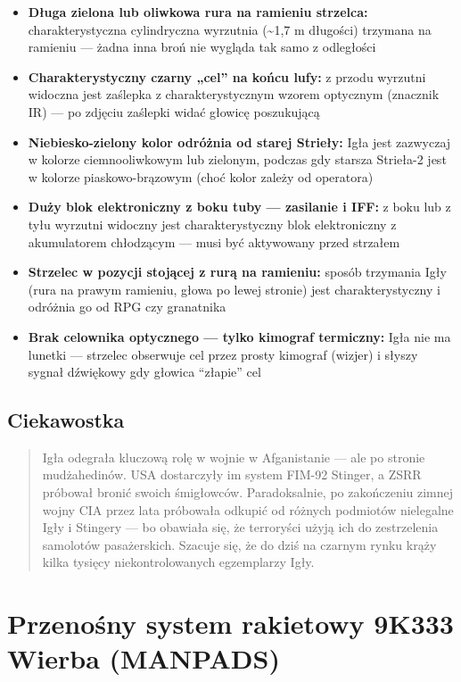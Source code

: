 \documentclass[12pt,oneside]{book}
\providecommand{\tightlist}{%
  \setlength{\itemsep}{0pt}\setlength{\parskip}{0pt}}
\begin{document}
\begin{itemize}
\tightlist
\item
  \textbf{Długa zielona lub oliwkowa rura na ramieniu strzelca:}
  charakterystyczna cylindryczna wyrzutnia (\textasciitilde1,7 m
  długości) trzymana na ramieniu --- żadna inna broń nie wygląda tak
  samo z odległości
\item
  \textbf{Charakterystyczny czarny „cel'' na końcu lufy:} z przodu
  wyrzutni widoczna jest zaślepka z charakterystycznym wzorem optycznym
  (znacznik IR) --- po zdjęciu zaślepki widać głowicę poszukującą
\item
  \textbf{Niebiesko-zielony kolor odróżnia od starej Strieły:} Igła jest
  zazwyczaj w kolorze ciemnooliwkowym lub zielonym, podczas gdy starsza
  Strieła-2 jest w kolorze piaskowo-brązowym (choć kolor zależy od
  operatora)
\item
  \textbf{Duży blok elektroniczny z boku tuby --- zasilanie i IFF:} z
  boku lub z tyłu wyrzutni widoczny jest charakterystyczny blok
  elektroniczny z akumulatorem chłodzącym --- musi być aktywowany przed
  strzałem
\item
  \textbf{Strzelec w pozycji stojącej z rurą na ramieniu:} sposób
  trzymania Igły (rura na prawym ramieniu, głowa po lewej stronie) jest
  charakterystyczny i odróżnia go od RPG czy granatnika
\item
  \textbf{Brak celownika optycznego --- tylko kimograf termiczny:} Igła
  nie ma lunetki --- strzelec obserwuje cel przez prosty kimograf
  (wizjer) i słyszy sygnał dźwiękowy gdy głowica ``złapie'' cel
\end{itemize}

\subsection{Ciekawostka}\label{ciekawostka-47}

\begin{quote}
Igła odegrała kluczową rolę w wojnie w Afganistanie --- ale po stronie
mudżahedinów. USA dostarczyły im system FIM-92 Stinger, a ZSRR próbował
bronić swoich śmigłowców. Paradoksalnie, po zakończeniu zimnej wojny CIA
przez lata próbowała odkupić od różnych podmiotów nielegalne Igły i
Stingery --- bo obawiała się, że terroryści użyją ich do zestrzelenia
samolotów pasażerskich. Szacuje się, że do dziś na czarnym rynku krąży
kilka tysięcy niekontrolowanych egzemplarzy Igły.
\end{quote}

\section{Przenośny system rakietowy 9K333 Wierba
(MANPADS)}\label{przenoux15bny-system-rakietowy-9k333-wierba-manpads}
\end{document}
